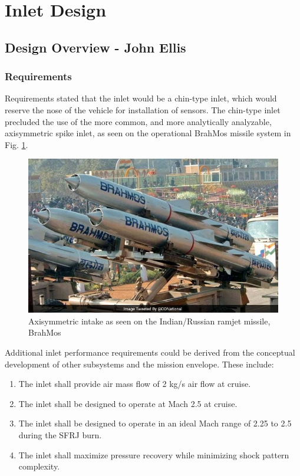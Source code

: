 \section{Inlet Design}

\subsection{Design Overview - John Ellis}
\subsubsection{Requirements}
Requirements stated that the inlet would be a chin-type inlet, which would reserve the nose of the vehicle for installation of sensors. The chin-type inlet precluded the use of the more common, and more analytically analyzable, axisymmetric spike inlet, as seen on the operational BrahMos missile system in Fig. \ref{fig:BrahMos}. 
\begin{figure}[H]
\centering
\includegraphics[width=.5\textwidth] {JWE_Figures/BrahMos_Intake2.jpg}
\caption{Axisymmetric intake as seen on the Indian/Russian ramjet missile, BrahMos \cite{varma_2018}}
\label{fig:BrahMos}
\end{figure}

Additional inlet performance requirements could be derived from the conceptual development of other subsystems and the mission envelope. These include:
\begin{enumerate}
\item The inlet shall provide air mass flow of 2 kg/s air flow at cruise.
\item The inlet shall be designed to operate at Mach 2.5 at cruise.
\item The inlet shall be designed to operate in an ideal Mach range of 2.25 to 2.5 during the SFRJ burn.
\item The inlet shall maximize pressure recovery while minimizing shock pattern complexity.
\end{enumerate}


